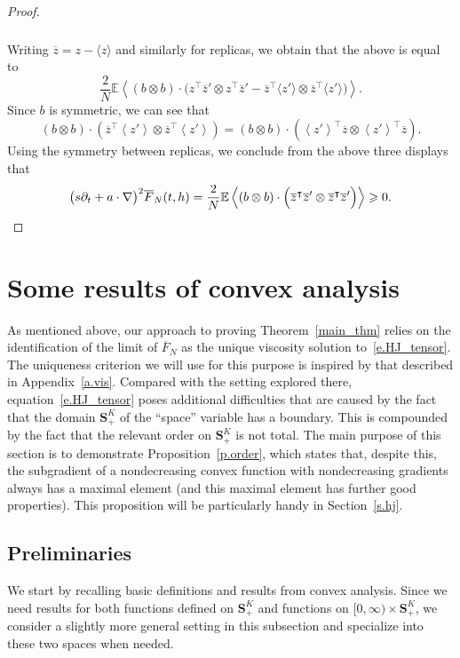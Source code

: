 \documentclass[10pt]{amsart}
\theoremstyle{definition}\newtheorem{defi}[theo]{Definition}\newtheorem{rema}[theo]{Remark}\newtheorem{exam}[theo]{Example}\newtheorem{exem}[theo]{Example}\newtheorem{nota}[theo]{Notation}
\newcommand{\E}{\mathbb{E}}
\renewcommand{\S}{\mathbf{S}}
\renewcommand{\geq}{\geqslant}
\renewcommand{\bar}{\overline}
\newcommand{\la}{\left\langle}
\newcommand{\ra}{\right\rangle}
\begin{document}
\begin{proof}
\begin{multline*}
\begin{aligned}
\end{aligned}
\end{multline*}
Writing $\bar z = z -\langle z \rangle$ and similarly for replicas, we obtain that the above is equal to
\[
\frac{2}{N}\E\la (b\otimes b)\cdot\Big(z^\intercal \bar z'\otimes z^\intercal \bar z' - \bar z^\intercal \langle z'\rangle \otimes \bar z^\intercal \langle z'\rangle\Big) \ra.
\]
Since $b$ is symmetric, we can see that
\[
(b\otimes b) \cdot \left(\bar z^\intercal \left\langle z'\right\rangle \otimes \bar z^\intercal \left\langle z'\right\rangle\right) = (b\otimes b) \cdot \left(\left\langle z'\right\rangle^\intercal \bar z \otimes \left\langle z'\right\rangle^\intercal \bar z\right).
\]
Using the symmetry between replicas, we conclude from the above three displays that
\[
\big(s\partial_t + a\cdot\nabla\big)^2\bar F_N(t,h)=\frac{2}{N}\E\la (b\otimes b)\cdot\Big(\bar z^\intercal \bar z'\otimes \bar z^\intercal \bar z' \Big) \ra\geq 0. \qedhere
\]
\end{proof}



\section{Some results of convex analysis}\label{s.convex}

As mentioned above, our approach to proving Theorem~\ref{main_thm} relies on the identification of the limit of $\bar F_N$ as the unique viscosity solution to~\eqref{e.HJ_tensor}. The uniqueness criterion we will use for this purpose is inspired by that described in Appendix~\ref{a.vis}. Compared with the setting explored there, equation~\eqref{e.HJ_tensor} poses additional difficulties that are caused by the fact that the domain $\S^K_+$ of the ``space'' variable has a boundary. This is compounded by the fact that the relevant order on $\S^K_+$ is not total. The main purpose of this section is to demonstrate Proposition~\ref{p.order}, which states that, despite this, the subgradient of a nondecreasing convex function with nondecreasing gradients always has a maximal element (and this maximal element has further good properties). This proposition will be particularly handy in Section~\ref{s.hj}.

\subsection{Preliminaries}


We start by recalling basic definitions and results from convex analysis. Since we need results for both functions defined on $\S^K_+$ and functions on $[0,\infty)\times \S^K_+$, we consider a slightly more general setting in this subsection and specialize into these two spaces when needed.
\end{document}

